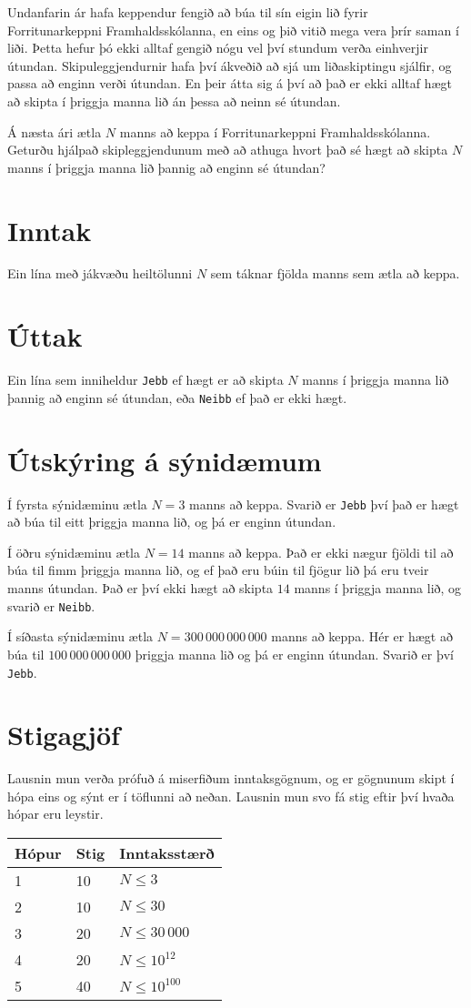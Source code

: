 Undanfarin ár hafa keppendur fengið að búa til sín eigin lið fyrir Forritunarkeppni Framhaldsskólanna, en eins og þið vitið mega vera þrír saman í liði. Þetta hefur þó ekki alltaf gengið nógu vel því stundum verða einhverjir útundan. Skipuleggjendurnir hafa því ákveðið að sjá um liðaskiptingu sjálfir, og passa að enginn verði útundan. En þeir átta sig á því að það er ekki alltaf hægt að skipta í þriggja manna lið án þessa að neinn sé útundan.

Á næsta ári ætla $N$ manns að keppa í Forritunarkeppni Framhaldsskólanna. Geturðu hjálpað skipleggjendunum með að athuga hvort það sé hægt að skipta $N$ manns í þriggja manna lið þannig að enginn sé útundan?

\section*{Inntak}
Ein lína með jákvæðu heiltölunni $N$ sem táknar fjölda manns sem ætla að keppa.

\section*{Úttak}
Ein lína sem inniheldur \texttt{Jebb} ef hægt er að skipta $N$ manns í þriggja manna lið þannig að enginn sé útundan, eða \texttt{Neibb} ef það er ekki hægt.

\section*{Útskýring á sýnidæmum}
Í fyrsta sýnidæminu ætla $N=3$ manns að keppa. Svarið er \texttt{Jebb} því það er hægt að búa til eitt þriggja manna lið, og þá er enginn útundan.

Í öðru sýnidæminu ætla $N=14$ manns að keppa. Það er ekki nægur fjöldi til að búa til fimm þriggja manna lið, og ef það eru búin til fjögur lið þá eru tveir manns útundan. Það er því ekki hægt að skipta $14$ manns í þriggja manna lið, og svarið er \texttt{Neibb}.

Í síðasta sýnidæminu ætla $N=300\,000\,000\,000$ manns að keppa. Hér er hægt að búa til $100\,000\,000\,000$ þriggja manna lið og þá er enginn útundan. Svarið er því \texttt{Jebb}.

\section*{Stigagjöf}
Lausnin mun verða prófuð á miserfiðum inntaksgögnum, og er gögnunum skipt í
hópa eins og sýnt er í töflunni að neðan. Lausnin mun svo fá stig eftir því
hvaða hópar eru leystir.

\begin{tabular}{|l|l|l|}
\hline
Hópur & Stig & Inntaksstærð \\ \hline
1 & 10 & $N \leq 3$ \\ \hline
2 & 10 & $N \leq 30$ \\ \hline
3 & 20 & $N \leq 30\,000$ \\ \hline
4 & 20 & $N \leq 10^{12}$ \\ \hline
5 & 40 & $N \leq 10^{100}$ \\ \hline
\end{tabular}

